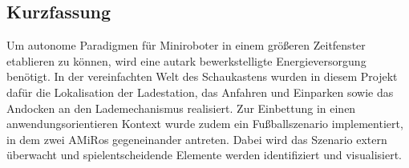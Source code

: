 \subsection*{Kurzfassung}

Um autonome Paradigmen für Miniroboter in einem größeren Zeitfenster etablieren zu können, wird eine autark bewerkstelligte Energieversorgung benötigt. In der vereinfachten Welt des Schaukastens wurden in diesem Projekt dafür die Lokalisation der Ladestation, das Anfahren und Einparken sowie das Andocken an den Lademechanismus realisiert. Zur Einbettung in einen anwendungsorientieren Kontext wurde zudem ein Fußballszenario implementiert, in dem zwei AMiRos gegeneinander antreten. Dabei wird das Szenario extern überwacht und spielentscheidende Elemente werden identifiziert und visualisiert. 
